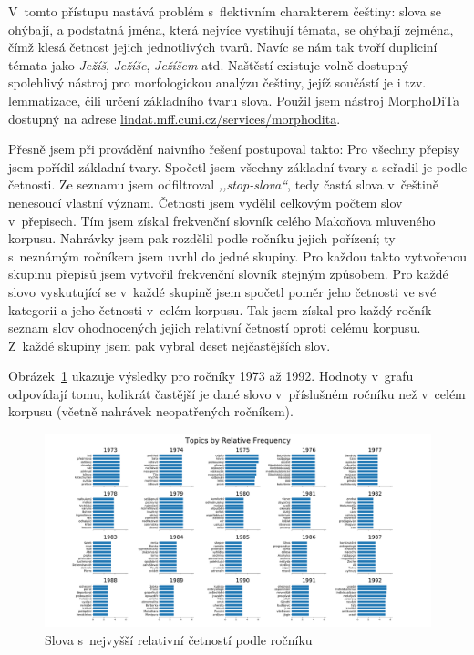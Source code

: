 V~tomto přístupu nastává problém s~flektivním charakterem češtiny: slova se
ohýbají, a podstatná jména, která nejvíce vystihují témata, se ohýbají zejména,
čímž klesá četnost jejich jednotlivých tvarů. Navíc se nám tak tvoří dupliciní
témata jako \textit{Ježíš}, \textit{Ježíše}, \textit{Ježíšem} atd. Naštěstí existuje volně
dostupný spolehlivý nástroj pro morfologickou analýzu češtiny, jejíž součástí je
i tzv. lemmatizace, čili určení základního tvaru slova. Použil jsem nástroj
MorphoDiTa\cite{morphodita} dostupný na adrese
\url{lindat.mff.cuni.cz/services/morphodita}.

Přesně jsem při provádění naivního řešení postupoval takto:
Pro všechny přepisy jsem pořídil základní tvary.
Spočetl jsem všechny základní tvary a seřadil je podle četnosti.
Ze seznamu jsem odfiltroval \textit{,,stop-slova``}, tedy častá slova v~češtině
nenesoucí vlastní význam.
Četnosti jsem vydělil celkovým počtem slov v~přepisech. Tím jsem získal
frekvenční slovník celého Makoňova mluveného korpusu.
Nahrávky jsem pak rozdělil podle ročníku jejich pořízení; ty s~neznámým ročníkem
jsem uvrhl do jedné skupiny.
Pro každou takto vytvořenou skupinu přepisů jsem vytvořil frekvenční slovník
stejným způsobem.
Pro každé slovo vyskutující se v~každé skupině jsem spočetl poměr jeho četnosti
ve své kategorii a jeho četnosti v~celém korpusu.
Tak jsem získal pro každý ročník seznam slov ohodnocených jejich relativní
četností oproti celému korpusu.
Z~každé skupiny jsem pak vybral deset nejčastějších slov.

Obrázek~\ref{fig:topic-by-year-relfreq} ukazuje výsledky pro ročníky 1973 až 1992.
Hodnoty v~grafu odpovídají tomu, kolikrát častější je dané slovo v~příslušném
ročníku než v~celém korpusu (včetně nahrávek neopatřených ročníkem).

\begin{figure}[htpb]
\includegraphics[scale=0.32, angle=90]{rc/topics-by-year-relfreq.pdf}
\caption{Slova s~nejvyšší relativní četností podle ročníku}
\label{fig:topic-by-year-relfreq}
\end{figure}

